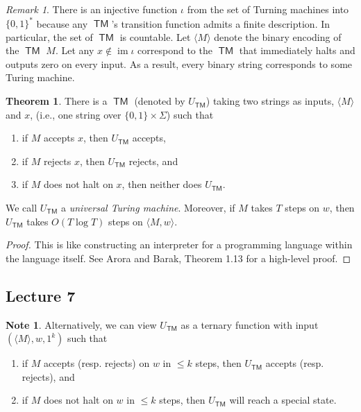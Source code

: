 \documentclass[10pt,letterpaper,cm]{nupset}
\theoremstyle{definition}
\newtheorem{note}[definition]{Note}
\theoremstyle{theorem}
\newtheorem{theorem}[definition]{Theorem}
\theoremstyle{remark}
\newtheorem{remark}[definition]{Remark}
\newcommand{\1}{\mathbf{1}}
\newcommand{\0}{\vec 0}
\DeclareMathOperator{\im}{im}
\DeclareMathOperator{\TM}{\mathsf{TM}}
\begin{document}
\begin{remark}
There is an injective function $\iota$ from the set of Turning machines into $\{0,1\}^{\ast}$ because any $\TM$'s transition function admits a finite description. In particular, the set of $\TM$ is countable. Let $\langle M \rangle $ denote the binary encoding of the $\TM$ $M$. Let any $x\notin \im{\iota}$ correspond to the $\TM$ that immediately halts and outputs zero on every input. As a result, every binary string corresponds to some Turing machine. 
\end{remark}

\begin{theorem}
 There is a $\TM$ (denoted by $U_{\TM}$) taking two strings as inputs, $\langle M \rangle$ and $x$, (i.e., one string over $\{0,1\} \times \Sigma$) such that
 \begin{enumerate}
 \item if $M$ accepts $x$, then $U_{\TM}$ accepts,
 \item if $M$ rejects $x$, then $U_{\TM}$ rejects, and
 \item if $M$ does not halt on $x$, then neither does $U_{\TM}$.
 \end{enumerate} We call $U_{\TM}$ a \textit{universal Turing machine}. Moreover, if $M$ takes $T$ steps on $w$, then $U_{\TM}$ takes $O(T \log{T})$ steps on $\langle M, w \rangle$.
\end{theorem}
\begin{proof}
This is like constructing an interpreter for a programming language within the language itself. See Arora and Barak, Theorem 1.13 for a high-level proof.
\end{proof}

\subsection{Lecture 7}

\begin{note}
Alternatively, we can view $U_{\TM}$ as a ternary function with input $(\langle M \rangle,  w, 1^k)$ such that
\begin{enumerate}
\item if $M$ accepts (resp. rejects) on $w$ in $\leq k$ steps, then $U_{\TM}$ accepts (resp. rejects), and
\item if $M$ does not halt on $w$ in $\leq k$ steps, then $U_{\TM}$ will reach a special state.
\end{enumerate}
\end{note}
\end{document}
